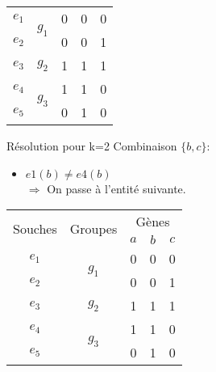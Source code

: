 \begin{overprint}
{\begin{minipage}[l]{0.46\linewidth}
\begin{center}
\begin{tabular}{|c||c|c|c|c|}
						\hline
						\hline
						$e_1$&\multirow{2}{*}{$g_1$}& 0 & \cellcolor{cyan}0 & 0\\
						\cline{1-1} \cline{3-5}
						$e_2$&& 0 & 0 & 1\\
						\hline
						\hline
						$e_3$&$g_2$& 1 & 1 & 1\\
						\hline
						\hline
						$e_4$&\multirow{2}{*}{$g_3$}& 1 & \cellcolor{cyan}1 & 0\\
						\cline{1-1} \cline{3-5}
						$e_5$&& 0 & 1 & 0\\
						\hline
					\end{tabular}
				\end{center}
			\end{minipage}
			\hspace{0.6cm}
			\begin{minipage}[r]{0.46\linewidth}
				\begin{block}{Résolution pour k=2}
					Combinaison $\{b,c\}$:
					\begin{itemize}
						\item $e1(b) \not = e4(b) $ \\ $\Rightarrow$ On passe à l'entité suivante.
					\end{itemize}
				\end{block}
			\end{minipage}
		}
		{
			\begin{minipage}[l]{0.46\linewidth}
				\begin{center}
					\begin{tabular}{|c||c|c|c|c|}
						\hline
						\multirow{2}{*}{Souches}&\multirow{2}{*}{Groupes}&\multicolumn{3}{c|}{Gènes
						}\\
						&&$a$&\cellcolor{blue!75}$b$&\cellcolor{blue!75}$c$\\
						\hline
						\hline
						$e_1$&\multirow{2}{*}{$g_1$}& 0 & \cellcolor{cyan}0 & 0\\
						\cline{1-1} \cline{3-5}
						$e_2$&& 0 & 0 & 1\\
						\hline
						\hline
						$e_3$&$g_2$& 1 & 1 & 1\\
						\hline
						\hline
						$e_4$&\multirow{2}{*}{$g_3$}& 1 & 1 & 0\\
						\cline{1-1} \cline{3-5}
						$e_5$&& 0 & \cellcolor{cyan}1 & 0\\
						\hline
					\end{tabular}
				\end{center}
			\end{minipage}
			\hspace{0.6cm}
}
\end{overprint}
